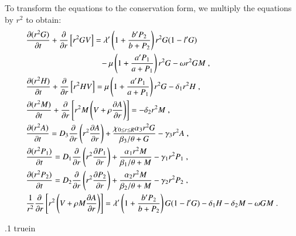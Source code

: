 \documentclass{amsart}
\theoremstyle{definition}
\theoremstyle{remark}
\numberwithin{equation}{section}
\numberwithin{figure}{section}
\newcommand{\po}[1]{\frac{\partial}{\partial{#1}}}
\newcommand{\pp}[2]{\frac{\partial {#1}}{\partial {#2}}}
\begin{document}
To transform the equations to the conservation form, we multiply the equations by $r^2$ to obtain:
\begin{subequations}\label{eq:eqn_pde_csrv}
\begin{align}
\label{eq:eqn_pde_csrv_g}
&\pp{(r^2G)}{t} + \po{r}\left[r^2GV\right] = \lambda'\left(1+\frac{b'P_2}{b+P_2}\right)r^2G(1-l'G) \\
\notag
& \hspace*{1.25in} - \mu\left(1+\frac{a'P_1}{a+P_1}\right) r^2G - \omega r^2GM\;, \\
\label{eq:eqn_pde_csrv_h}
&\pp{(r^2H)}{t} + \po{r}\left[r^2HV\right] = \mu \left(1+\frac{a'P_1}{a+P_1}\right)r^2G - \delta_1 r^2H\;, \\
\label{eq:eqn_pde_csrv_m}
&
\pp{(r^2M)}{t} + \po{r}\left[r^2M\left(V+\rho\pp{A}{r}\right)\right] = - \delta_2r^2M\;,\\
\label{eq:eqn_pde_csrv_a}
&\pp{(r^2A)}{t} = D_3\po{r}\left(r^2\pp{A}{r}\right) + \frac{\chi_{0\le r\le R}\alpha_3r^2G}{\beta_3/\theta+G} - \gamma_3 r^2A\;,\\
\label{eq:eqn_pde_csrv_p1}
&\pp{(r^2P_1)}{t} = D_1\po{r}\left(r^2\pp{P_1}{r}\right) + \frac{\alpha_1r^2M}{\beta_1/\theta+M} - \gamma_1 r^2P_1\;,\\
\label{eq:eqn_pde_csrv_p2}
&\pp{(r^2P_2)}{t} = D_2\po{r}\left(r^2\pp{P_2}{r}\right) + \frac{\alpha_2r^2M}{\beta_2/\theta+M} - \gamma_2 r^2P_2\;,\\
\label{eq:eqn_pde_csrv_v}
&
\frac{1}{r^2}\po{r}\left[r^2\left(V+\rho M\pp{A}{r}\right)\right] = \lambda'\left(1+\frac{b'P_2}{b+P_2}\right) G(1-l'G) - \delta_1 H - \delta_2M - \omega GM\;.
\end{align}
\end{subequations}

\vglue .1 truein
\end{document}
